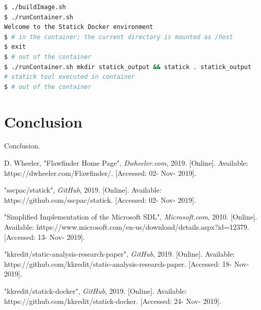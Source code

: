 \documentclass[journal]{IEEEtran}
\begin{document}
\begin{lstlisting}[language=bash, caption=Using the Statick Docker Container, label=lst:statick_container]
$ ./buildImage.sh
$ ./runContainer.sh
Welcome to the Statick Docker environment
$ # in the container; the current directory is mounted as /host
$ exit
$ # out of the container
$ ./runContainer.sh mkdir statick_output && statick . statick_output
# statick tool executed in container
$ # out of the container
\end{lstlisting}

\section{Conclusion}
Conclusion.



\begin{thebibliography}{00}

 D. Wheeler, "Flawfinder Home Page", \textit{Dwheeler.com}, 2019. [Online].
Available: https://dwheeler.com/Flawfinder/. [Accessed: 02- Nov- 2019].

 "sscpac/statick", \textit{GitHub}, 2019. [Online]. Available:
https://github.com/sscpac/statick. [Accessed: 02- Nov- 2019].

 "Simplified Implementation of the Microsoft SDL", \textit{Microsoft.com}, 2010.
[Online]. Available: https://www.microsoft.com/en-us/download/details.aspx?id=12379. [Accessed: 13-
Nov- 2019].

 "kkredit/static-analysis-research-paper", \textit{GitHub}, 2019. [Online].
Available: https://github.com/kkredit/static-analysis-research-paper. [Accessed: 18- Nov- 2019].

 "kkredit/statick-docker", \textit{GitHub}, 2019. [Online]. Available:
https://github.com/kkredit/statick-docker. [Accessed: 24- Nov- 2019].

\end{thebibliography}
\end{document}

